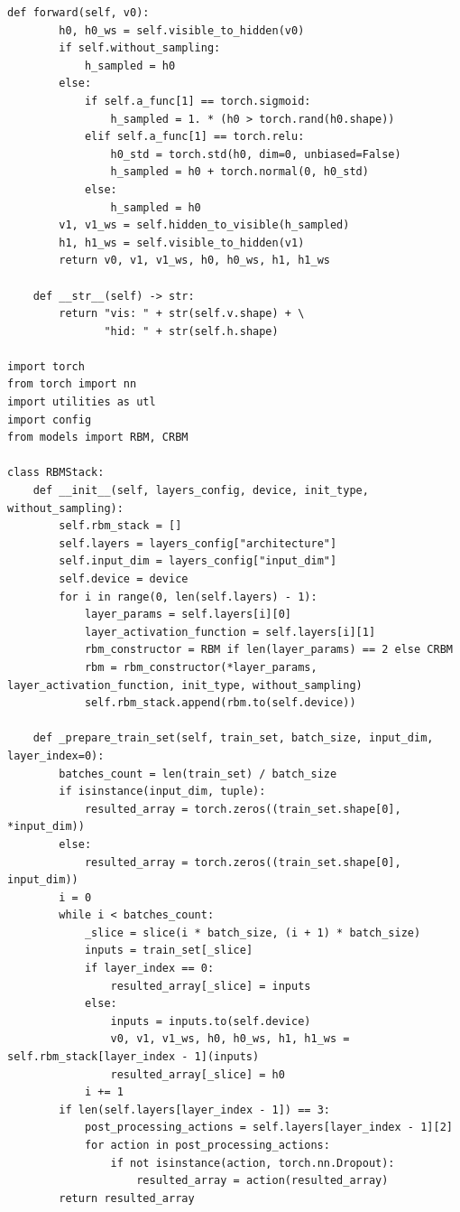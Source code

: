 \begin{lstlisting}[style=PythonStyle]
    def forward(self, v0):
        h0, h0_ws = self.visible_to_hidden(v0)
        if self.without_sampling:
            h_sampled = h0
        else:
            if self.a_func[1] == torch.sigmoid:
                h_sampled = 1. * (h0 > torch.rand(h0.shape))
            elif self.a_func[1] == torch.relu:
                h0_std = torch.std(h0, dim=0, unbiased=False)
                h_sampled = h0 + torch.normal(0, h0_std)
            else:
                h_sampled = h0
        v1, v1_ws = self.hidden_to_visible(h_sampled)
        h1, h1_ws = self.visible_to_hidden(v1)
        return v0, v1, v1_ws, h0, h0_ws, h1, h1_ws

    def __str__(self) -> str:
        return "vis: " + str(self.v.shape) + \
               "hid: " + str(self.h.shape)
               
import torch
from torch import nn
import utilities as utl
import config
from models import RBM, CRBM

class RBMStack:
    def __init__(self, layers_config, device, init_type, without_sampling):
        self.rbm_stack = []
        self.layers = layers_config["architecture"]
        self.input_dim = layers_config["input_dim"]
        self.device = device
        for i in range(0, len(self.layers) - 1):
            layer_params = self.layers[i][0]
            layer_activation_function = self.layers[i][1]
            rbm_constructor = RBM if len(layer_params) == 2 else CRBM
            rbm = rbm_constructor(*layer_params, layer_activation_function, init_type, without_sampling)
            self.rbm_stack.append(rbm.to(self.device))

    def _prepare_train_set(self, train_set, batch_size, input_dim, layer_index=0):
        batches_count = len(train_set) / batch_size
        if isinstance(input_dim, tuple):
            resulted_array = torch.zeros((train_set.shape[0], *input_dim))
        else:
            resulted_array = torch.zeros((train_set.shape[0], input_dim))
        i = 0
        while i < batches_count:
            _slice = slice(i * batch_size, (i + 1) * batch_size)
            inputs = train_set[_slice]
            if layer_index == 0:
                resulted_array[_slice] = inputs
            else:
                inputs = inputs.to(self.device)
                v0, v1, v1_ws, h0, h0_ws, h1, h1_ws = self.rbm_stack[layer_index - 1](inputs)
                resulted_array[_slice] = h0
            i += 1
        if len(self.layers[layer_index - 1]) == 3:
            post_processing_actions = self.layers[layer_index - 1][2]
            for action in post_processing_actions:
                if not isinstance(action, torch.nn.Dropout):
                    resulted_array = action(resulted_array)
        return resulted_array


\end{lstlisting}
